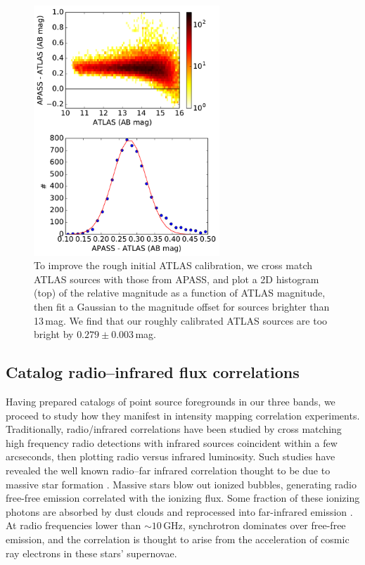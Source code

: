\documentclass[numberedappendix]{emulateapj}
\begin{document}
\begin{figure}[t]
\centering
\includegraphics[width=2.75in]{ATLAS_vs_APASS_cal.pdf}
\caption[To improve the rough initial ATLAS calibration, we cross match ATLAS sources with those from APASS.]{To improve the rough initial ATLAS calibration, we cross match ATLAS sources with those from APASS, and plot a 2D histogram (top) of the relative magnitude as a function of ATLAS magnitude, then fit a Gaussian to the magnitude offset for sources brighter than 13\,mag. We find that our roughly calibrated ATLAS sources are too bright by $0.279\pm0.003$\,mag.}
\label{fig:ATLASvsAPASS}
\end{figure}


\subsection{Catalog radio--infrared flux correlations}
\label{sec:catcorrelations}

Having prepared catalogs of point source foregrounds in our three bands, we proceed to study how they manifest in intensity mapping correlation experiments. Traditionally, radio/infrared correlations have been studied by cross matching high frequency radio detections with infrared sources coincident within a few arcseconds, then plotting radio versus infrared luminosity. Such studies have revealed the well known radio--far infrared correlation thought to be due to massive star formation \citep[e.g.][]{helou85,dejong85,yun01,xu94,mauch07,Willott03}. Massive stars blow out ionized bubbles, generating radio free-free emission correlated with the ionizing flux. Some fraction of these ionizing photons are absorbed by dust clouds and reprocessed into far-infrared emission \citep{xu94}. At radio frequencies lower than $\sim10$\,GHz, synchrotron dominates over free-free emission, and the correlation is thought to arise from the acceleration of cosmic ray electrons in these stars' supernovae. 
\end{document}
